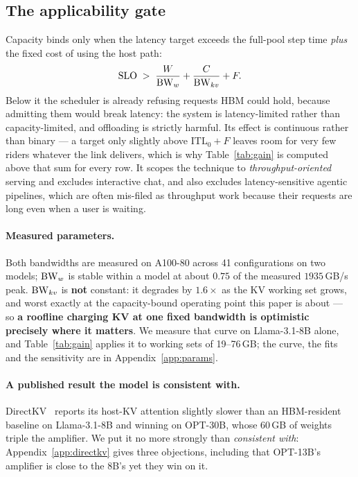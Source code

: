 \subsection{The applicability gate}
\label{sec:model:gate}

Capacity binds only when the latency target exceeds the full-pool step time
\emph{plus} the fixed cost of using the host path:
%
\begin{equation}
\label{eq:gate}
\mathrm{SLO} \;>\; \frac{W}{\mathrm{BW}_w} + \frac{C}{\mathrm{BW}_{kv}} + F.
\end{equation}
%
Below it the scheduler is already refusing requests HBM could hold, because
admitting them would break latency: the system is latency-limited rather than
capacity-limited, and offloading is strictly harmful. Its effect is continuous
rather than binary --- a target only slightly above $\mathrm{ITL}_0 + F$ leaves room
for very few riders whatever the link delivers, which is why Table~\ref{tab:gain} is
computed above that sum for every row. It scopes the technique to
\emph{throughput-oriented} serving and excludes interactive chat, and also excludes
latency-sensitive agentic pipelines, which are often mis-filed as throughput work
because their requests are long even when a user is waiting.

\paragraph{Measured parameters.}
\label{sec:model:params}
Both bandwidths are measured on A100-80 across 41 configurations on two models;
$\mathrm{BW}_w$ is stable within a model at about $0.75$ of the measured $1935$\,GB/s peak.
$\mathrm{BW}_{kv}$ is \textbf{not} constant: it degrades by $1.6\times$ as the KV working
set grows, and worst exactly at the capacity-bound operating point this paper is
about --- so \textbf{a roofline charging KV at one fixed bandwidth is optimistic
precisely where it matters}. We measure that curve on Llama-3.1-8B alone, and
Table~\ref{tab:gain} applies it to working sets of 19--76\,GB; the curve, the fits
and the sensitivity are in Appendix~\ref{app:params}.

\paragraph{A published result the model is consistent with.}
\label{sec:model:directkv}
DirectKV~\cite{directkv} reports its host-KV attention slightly slower than an
HBM-resident baseline on Llama-3.1-8B and winning on OPT-30B, whose 60\,GB of
weights triple the amplifier. We put it no more strongly than \emph{consistent
with}: Appendix~\ref{app:directkv} gives three objections, including that OPT-13B's
amplifier is close to the 8B's yet they win on it.
